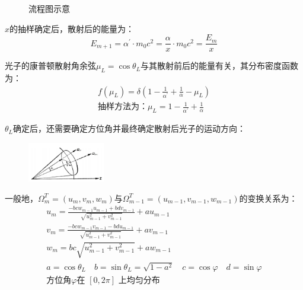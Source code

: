\documentclass{article}
\begin{document}
\begin{enumerate}[label=\Alph*.]
\begin{figure}[H]
    
        \caption{流程图示意}
    \end{figure}
        
    $x $的抽样确定后，散射后的能量为：
    \begin{equation}
        E_{m+1}=\alpha^{\prime}\cdot m_0c^2=\frac{\alpha}{x}\cdot m_0c^2=\frac{E_m}{x}
    \end{equation}

    光子的康普顿散射角余弦$\mu _L=\cos\theta _L$与其散射前后的能量有关，其分布密度函数为：
    \begin{equation}
        \begin{gathered}
            f(\mu_L)=\delta(1-\frac1{\alpha^{\prime}}+\frac1\alpha-\mu_L)\\
            \text{抽样方法为：}\mu_L=1-\frac1{\alpha^{\prime}}+\frac1\alpha 
        \end{gathered}
    \end{equation}

    $\theta _L$确定后，还需要确定方位角并最终确定散射后光子的运动方向：
    \begin{figure}[H]
        \centering
        \includegraphics[width=0.3\textwidth]{jiaodu.png}
        \label{}
    \end{figure}
    
    一般地，$\varOmega ^T_m=(u_m,v_m,w_m)$与$\varOmega ^T_{m-1}=(u_{m-1},v_{m-1},w_{m-1})$的变换关系为：
    \begin{equation}
        \begin{gathered}
            u_m=\frac{-bcw_{m-1}u_{m-1}+bdv_{m-1}}{\sqrt{u_{m-1}^2+v_{m-1}^2}}+au_{m-1}\\
            v_{m}=\frac{-bcw_{m-1}v_{m-1}-bdu_{m-1}}{\sqrt{u_{m-1}^2+v_{m-1}^2}}+av_{m-1}\\
            w_m=bc\sqrt{u_{m-1}^2+v_{m-1}^2}+aw_{m-1}\\
            a=\cos\theta_L\quad b=\sin\theta_L=\sqrt{1-a^2}\quad c=\cos\varphi\quad d=\sin\varphi\\
            \text{方位角}\varphi\text{在 }[0,2\pi]\text{ 上均匀分布}
        \end{gathered}
    \end{equation}


\end{enumerate}
\end{document}
